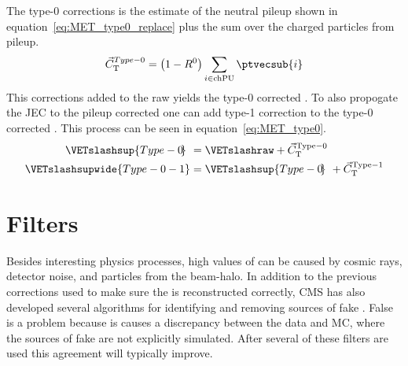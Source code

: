 The type-0 corrections is the estimate of the neutral pileup shown in equation~\ref{eq:MET_type0_replace} plus the sum over the charged particles from pileup.
\begin{equation}
	\label{eq:MET_type0_correction}
\vec{C}_{\mathrm{T}}^{Type-0}=\left(1-R^{0}\right)\sum_{i \in \mathrm{chPU}}\ptvecsub{i}
\end{equation}
This corrections added to the raw \VETslash yields the type-0 corrected \VETslash. To also propogate the JEC to the pileup corrected \VETslash one can add type-1 correction to the type-0 corrected \VETslash. This process can be seen in equation~\ref{eq:MET_type0}. 
\begin{equation}
\begin{aligned}
	\label{eq:MET_type0}
\VETslashsup{Type-0\hspace{-0.22em}}\hspace{0.37em}={}&\VETslashraw+\vec{C}_{\mathrm{T}}^{\mathrm{Type-0}} \\
\VETslashsupwide{Type-0-1}={}&\VETslashsup{Type-0\hspace{-0.22em}}\hspace{0.37em}+\vec{C}_{\mathrm{T}}^{\mathrm{Type-1}}
\end{aligned}
\end{equation}

\section{\texorpdfstring{\VETslash}{MET} Filters}
\label{appendix:met_filters}
Besides interesting physics processes, high values of \ETslash can be caused by cosmic rays, detector noise, and particles from the beam-halo.
In addition to the previous corrections used to make sure the \VETslash is reconstructed correctly, CMS has also developed several algorithms for identifying and removing sources of fake \VETslash.
False \VETslash is a problem because is causes a discrepancy between the data and MC, where the sources of fake \VETslash are not explicitly simulated.
After several of these filters are used this agreement will typically improve.
